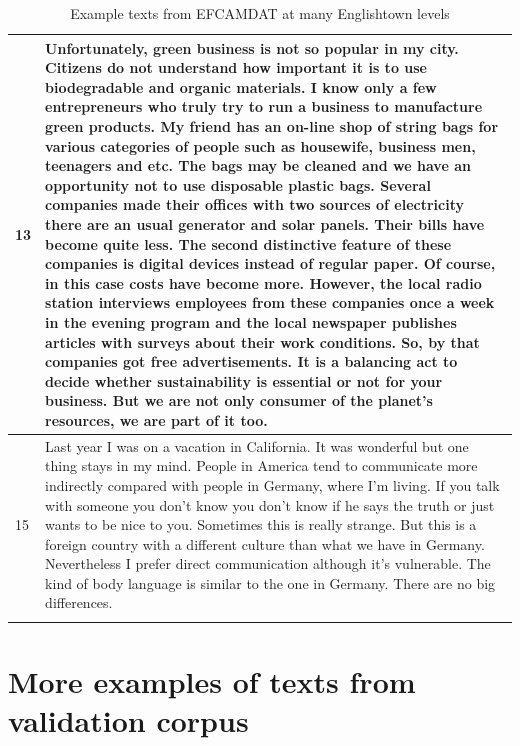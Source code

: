 \documentclass[11pt,a4paper]{article}
\begin{document}
\begin{longtable}{l|p{}}
  \midrule
  13 & Unfortunately, green business is not so popular in my city. Citizens do
  not understand how important it is to use biodegradable and organic
  materials. I know only a few entrepreneurs who truly try to run a business to
  manufacture green products. My friend has an on-line shop of string bags for
  various categories of people such as housewife, business men, teenagers and
  etc. The bags may be cleaned and we have an opportunity not to use disposable
  plastic bags. Several companies made their offices with two sources of
  electricity there are an usual generator and solar panels. Their bills have
  become quite less. The second distinctive feature of these companies is
  digital devices instead of regular paper. Of course, in this case costs have
  become more. However, the local radio station interviews employees from these
  companies once a week in the evening program and the local newspaper
  publishes articles with surveys about their work conditions. So, by that
  companies got free advertisements. It is a balancing act to decide whether
  sustainability is essential or not for your business. But we are not only
  consumer of the planet's resources, we are part of it too.\\
  \midrule
  15 & Last year I was on a vacation in California. It was wonderful but one
  thing stays in my mind. People in America tend to communicate more indirectly
  compared with people in Germany, where I'm living. If you talk with someone
  you don't know you don't know if he says the truth or just wants to be nice
  to you. Sometimes this is really strange. But this is a foreign country with
  a different culture than what we have in Germany. Nevertheless I prefer
  direct communication although it's vulnerable. The kind of body language is
  similar to the one in Germany. There are no big differences.\\
  \bottomrule
  \caption{Example texts from EFCAMDAT at many Englishtown levels}
\end{longtable}

\section{More examples of texts from validation corpus}
\end{document}
